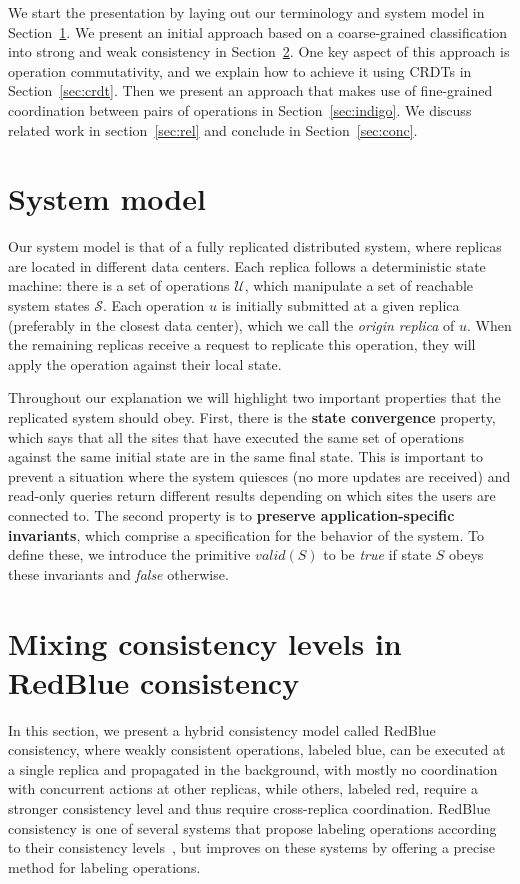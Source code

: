 \documentclass[11pt,dvipdfm]{article}
\begin{document}
We start the presentation by laying out our terminology and system model in Section~\ref{sec:model}. We present an initial approach based on a coarse-grained classification into strong and weak consistency in Section~\ref{sec:redblue}. One key aspect of this approach is operation commutativity, and we explain how to achieve it using CRDTs in Section~\ref{sec:crdt}. Then we present an approach that makes use of fine-grained coordination between pairs of operations in Section~\ref{sec:indigo}. We discuss related work in section~\ref{sec:rel} and conclude in Section~\ref{sec:conc}.

\section{System model}
\label{sec:model}


Our system model is that of a
fully replicated distributed system, where replicas are located in different data centers. Each replica follows a deterministic state machine: there is a set of operations $\mathcal{U}$, which manipulate
a set of reachable system states $\mathcal{S}$.
Each operation $u$ is initially submitted at a given replica (preferably in the closest data center), which we
call the \emph{origin replica} of $u$.
When the remaining replicas receive a request to replicate this operation, they will apply the operation against their local state.

Throughout our explanation we will highlight two important properties
that the replicated system should obey. First, there is
the {\bf state convergence} property, which says that all the sites
that have executed the same set of operations against the same initial state are in the same final state.
This is important to prevent a situation where
the system quiesces (no more updates are received) and
read-only queries return different results
depending on which sites the users are connected to.
The second property is to {\bf preserve application-specific invariants}, which comprise a specification for the behavior of the system.
To define these, we introduce the primitive $\textit{valid}(S)$ to be {\it
  true} if state $S$ obeys these invariants and {\it false}
otherwise.

\section{Mixing consistency levels in RedBlue consistency}
\label{sec:redblue}

In this section, we present a hybrid consistency model called RedBlue
consistency, where weakly consistent operations, labeled blue, can be executed at a
single replica and propagated in the background, with mostly no
coordination with concurrent actions at other replicas, while others, labeled red,
require a stronger consistency level and thus require cross-replica
coordination. RedBlue consistency is one of several systems that
propose labeling operations according to their consistency levels~\cite{Ladin1992LazyReplication, Singh2009Zeno,Li2012RedBlue,Pileus}, but improves on these systems by offering a precise method for labeling operations.
\end{document}
